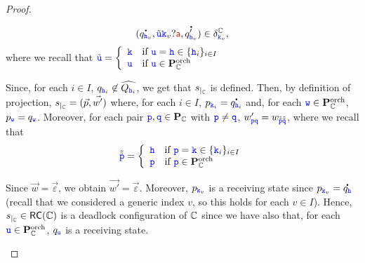 \begin{proof}
\begin{description}
$$({\dot {q_{\HH_v}}},\tilde{\ttu}{\KK_v}?\msg[a],\dot {q'_{\HH_v}})\in \delta^{\cs}_{\KK_v},$$
where we recall that $\tilde{\ttu} = \left\{\begin{array}{l@{\quad\text{if }}l}
                                                                \kk & \ttu=\hh\in\Set{\HH_i}_{i \in I}\\
                                                                \ttu & \ttu\in\rolescsint
                                          \end{array}\right.$
       
Since, for each $i\in I$, $q_{{\mathtt{\color{blue}{ {h}}}}_i}\not\in\widehat{Q_{{\mathtt{\color{blue}{ {h}}}}_i}}$, we get that
${s}_{\mid_{\mathbf{\mathbb{C}}}}$ is defined.                              
Then, by definition of projection, ${s}_{\mid_{\mathbf{\mathbb{C}}}} = (\vec{p},\vec{w'})$
where, for each $i \in   I$, $p_{{\mathtt{\color{blue}{ {k}}}}_i} = \accentset{\mbox{\large\bfseries .}}{q_{{ \ensuremath{\mathtt{\color{blue}{ {h}}}} }_i}}$  and, for each ${\mathtt{\color{blue}{ {w}}}} \in   \mathbf{P}_{\mathbb{C}}^{\mathrm{orch}}$, $p_{{\mathtt{\color{blue}{ {w}}}}} = q_{{\mathtt{\color{blue}{ {w}}}}}$.
Moreover, 
for each pair ${\mathtt{\color{blue}{ {p}}}},{\mathtt{\color{blue}{ {q}}}}\in \mathbf{P}_{\mathbb{C}}$ with ${\mathtt{\color{blue}{ {p}}}}\neq{ \ensuremath{\mathtt{\color{blue}{ {q}}}} }$, 
$w'_{{\mathtt{\color{blue}{ {p}}}}{\mathtt{\color{blue}{ {q}}}}} = w_{\tilde{\tilde{{\mathtt{\color{blue}{ {p}}}}}}\tilde{\tilde{{\mathtt{\color{blue}{ {q}}}}}}}$,
where we recall that
$$\tilde{\tilde{\ttp}} = \left\{\begin{array}{l@{\quad\text{if }}l}
                                                                \hh & \ttp=\kk\in\Set{\kk_i}_{i \in I}\\
                                                                \ttp & \ttp\in\rolescsint
                                          \end{array}\right.$$ 
 

Since $\vec{w} = \vec{\varepsilon}$, we obtain
 $\vec{w'}=\vec{\varepsilon}$. Moreover, $p_{{\mathtt{\color{blue}{ {k}}}}_v}$ is a receiving state since $p_{{\mathtt{\color{blue}{ {k}}}}_v}={\accentset{\mbox{\large\bfseries .}}{q_{{ \ensuremath{\mathtt{\color{blue}{ {h}}}} }}}}$ (recall that we considered a generic index $v$, so this holds for each $v\in I$).
 Hence,  ${s}_{\mid_{\mathbf{\mathbb{C}}}}\in \mathsf{RC}(\mathbb{C})$ is a deadlock configuration of $\mathbb{C}$
 since we have also that, for each ${\mathtt{\color{blue}{ {u}}}}\in\mathbf{P}_{\mathbb{C}}^{\mathrm{orch}}$, $q_{{\mathtt{\color{blue}{ {u}}}}}$ is a receiving state.
 \end{description}
 \end{proof}
